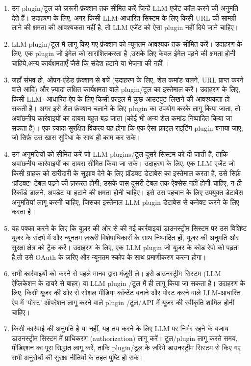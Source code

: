 \documentclass[
]{article}
\providecommand{\tightlist}{%
  \setlength{\itemsep}{0pt}\setlength{\parskip}{0pt}}
\begin{document}
\begin{enumerate}
\def\labelenumi{\arabic{enumi}.}
\tightlist
\item
  उन plugin/टूल को ज़रूरी फ़ंक्शन तक सीमित करें जिन्हें LLM एजेंट कॉल करने की अनुमति देते
  हैं। उदाहरण के लिए, अगर किसी LLM-आधारित सिस्टम के लिए किसी URL की सामग्री
  लाने की क्षमता की आवश्यकता नहीं है, तो LLM एजेंट को ऐसा plugin नहीं दिये जाने
  चाहिए।
\item
  LLM plugin/टूल में लागू किए गए फ़ंक्शन को न्यूनतम आवश्यक तक सीमित करें। उदाहरण के
  लिए, एक plugin जो ईमेल को सारांशितकरता है ,उसके लिए केवल ईमेल पढ़ने की क्षमता
  होनी चाहिये,अन्य कार्यक्षमताएँ जैसे कि संदेश हटाने या भेजना की नहीं ।
\item
  जहाँ संभव हो, ओपन-एंडेड फ़ंक्शन से बचें (उदाहरण के लिए, शेल कमांड चलने, URL प्राप्त
  करने वाले आदि) और ज़्यादा लक्षित कार्यक्षमता वाले plugin/टूल का इस्तेमाल करें।
  उदाहरण के लिए, किसी LLM- आधारित ऐप के लिए किसी फ़ाइल में कुछ आउटपुट लिखने की
  आवश्यकता हो सकती है। अगर इसे शेल फ़ंक्शन चलाने के लिए plugin का उपयोग करके लागू
  किया जाता, तो अवांछनीय कार्रवाइयों का दायरा बहुत बड़ जाता (कोई भी अन्य शेल
  कमांड निष्पादित किया जा सकता है)। एक ज़्यादा सुरक्षित विकल्प यह होगा कि एक ऐसा
  फ़ाइल-राइटिंग plugin बनाया जाए, जो सिर्फ़ उस खास सुविधा के साथ ही काम कर सके।
\item
  उन अनुमतियों को सीमित करें जो LLM plugins/टूल दूसरे सिस्टम को दी जाती हैं, ताकि
  अवांछनीय कार्रवाइयों का दायरा सीमित किया जा सके। उदाहरण के लिए, एक LLM एजेंट
  जो किसी ग्राहक को खरीदारी के सुझाव देने के लिए प्रॉडक्ट डेटाबेस का इस्तेमाल करता
  है, उसे सिर्फ़ `प्रॉडक्ट' टेबल पढ़ने की ज़रूरत होगी; उसके पास दूसरी टेबल तक ऐक्सेस नहीं
  होनी चाहिए, न ही रिकॉर्ड डालने, अपडेट या हटाने की क्षमता होनी चाहिए। इसे उस
  पहचान के लिए उपयुक्त डेटाबेस अनुमतियां लागू करनी चाहिए, जिसका इस्तेमाल LLM
  plugin डेटाबेस से कनेक्ट करने के लिए करता है।
\item
  यह पक्का करने के लिए कि यूज़र की ओर से की गई कार्रवाइयां डाउनस्ट्रीम सिस्टम पर उस
  विशिष्ट यूज़र के संदर्भ में और न्यूनतम ज़रूरी विशेषाधिकारों के साथ निष्पादित हों, यूज़र
  की अनुमति और सुरक्षा क्षेत्र को ट्रैक करें। उदाहरण के लिए, एक LLM plugin जो यूज़र के
  कोड रेपो को पढ़ता है,तो उसे OAuth के ज़रिए और न्यूनतम स्कोप के साथ प्रमाणीकरण
  करना होगा।
\item
  सभी कार्रवाइयों को करने से पहले मानव द्वारा मंज़ूरी ले। इसे डाउनस्ट्रीम सिस्टम (LLM
  ऐप्लिकेशन के दायरे से बाहर) या LLM plugin /टूल में ही लागू किया जा सकता है।
  उदाहरण के लिए, किसी यूज़र की ओर से सोशल मीडिया कॉन्टेंट बनाने और पोस्ट करने वाले
  LLM-आधारित ऐप में `पोस्ट' ऑपरेशन लागू करने वाले plugin /टूल/API में यूज़र की
  स्वीकृति शामिल होनी चाहिए।
\item
  किसी कार्रवाई की अनुमति है या नहीं, यह तय करने के लिए LLM पर निर्भर रहने के
  बजाय डाउनस्ट्रीम सिस्टम में प्राधिकरण (authorization) लागू करें। टूल/plugin लागू
  करते समय, मीडिएशन का पूरा सिद्धांत लागू करें, ताकि plugin/टूल के ज़रिये डाउनस्ट्रीम
  सिस्टम से किए गए सभी अनुरोधों की सुरक्षा नीतियों के तहत पुष्टि हो सके।
\end{enumerate}
\end{document}
